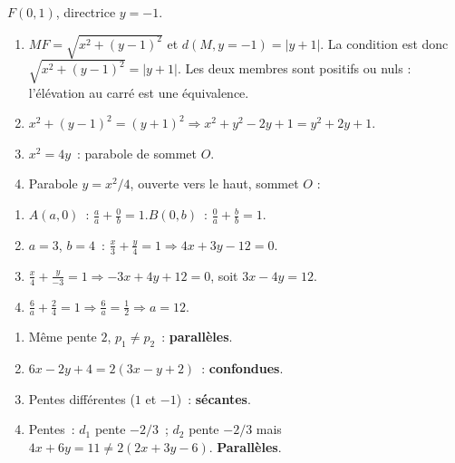 
$F(0,1)$, directrice $y=-1$.
\begin{enumerate}
  \item $MF=\sqrt{x^2+(y-1)^2}$ et $d(M,y=-1)=|y+1|$.
        La condition est donc $\sqrt{x^2+(y-1)^2}=|y+1|$.
        Les deux membres sont positifs ou nuls : l'\'el\'evation au carr\'e est une \'equivalence.
  \item $x^2+(y-1)^2=(y+1)^2\Rightarrow x^2+y^2-2y+1=y^2+2y+1$.
  \item $x^2=4y$~: parabole de sommet $O$.
  \item Parabole $y=x^2/4$, ouverte vers le haut, sommet $O$ :
\begin{center}
\end{center}
\end{enumerate}


\begin{enumerate}
  \item $A(a,0)$~: $\frac{a}{a}+\frac{0}{b}=1$.\checkmark\quad $B(0,b)$~: $\frac{0}{a}+\frac{b}{b}=1$.\checkmark
  \item $a=3$, $b=4$~: $\frac{x}{3}+\frac{y}{4}=1\Rightarrow4x+3y-12=0$.
  \item $\frac{x}{4}+\frac{y}{-3}=1\Rightarrow-3x+4y+12=0$, soit $3x-4y=12$.
  \item $\frac{6}{a}+\frac{2}{4}=1\Rightarrow\frac{6}{a}=\frac{1}{2}\Rightarrow a=12$.
\end{enumerate}


\begin{enumerate}
  \item M\^eme pente $2$, $p_1\ne p_2$~: \textbf{parall\`eles}.
  \item $6x-2y+4=2(3x-y+2)$~: \textbf{confondues}.
  \item Pentes diff\'erentes ($1$ et $-1$)~: \textbf{s\'ecantes}.
  \item Pentes~: $d_1$ pente $-2/3$~; $d_2$ pente $-2/3$ mais $4x+6y=11\ne2(2x+3y-6)$. \textbf{Parall\`eles}.
\end{enumerate}

